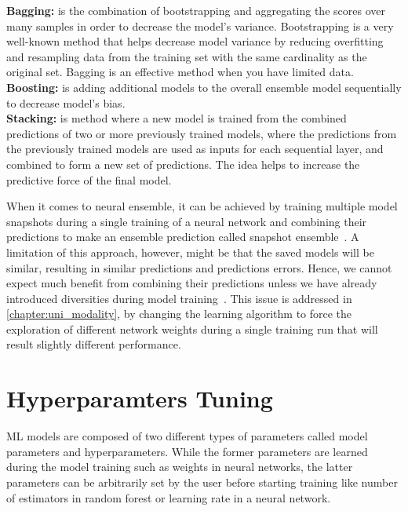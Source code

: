 \vspace{-2mm}
\begin{tcolorbox}[colback=white!3!white,colframe=gray!120!black,title=\faBook~Ensemble concepts]
    \scriptsize{
        \textbf{Bagging:} is the combination of bootstrapping and aggregating the scores over many samples in order to decrease the model’s variance. Bootstrapping is a very well-known method that helps decrease model variance by reducing overfitting and resampling data from the training set with the same cardinality as the original set. Bagging is an effective method when you have limited data. \\
        \textbf{Boosting:} is adding additional models to the overall ensemble model sequentially to decrease model’s bias. \\
        \textbf{Stacking:} is method where a new model is trained from the combined predictions of two or more previously trained models, where the predictions from the previously trained models are used as inputs for each sequential layer, and combined to form a new set of predictions. The idea helps to increase the predictive force of the final model. 
        }
\end{tcolorbox}

\hspace*{3.5mm} When it comes to neural ensemble, it can be achieved by training multiple model snapshots during a single training of a neural network and combining their predictions to make an ensemble prediction called snapshot ensemble~\cite{huang2017snapshot}. A limitation of this approach, however, might be that the saved models will be similar, resulting in similar predictions and predictions errors. Hence, we cannot expect much benefit from combining their predictions unless we have already introduced diversities during model training~\cite{huang2017snapshot}. This issue is addressed in \cref{chapter:uni_modality}, by changing the learning algorithm to force the exploration of different network weights during a single training run that will result slightly different performance\cite{karimACCA2019}. 

\section{Hyperparamters Tuning}
ML models are composed of two different types of parameters called model parameters and hyperparameters. While the former parameters are learned during the model training such as weights in neural networks, the latter parameters can be arbitrarily set by the user before starting training like number of estimators in random forest or learning rate in a neural network. \\

